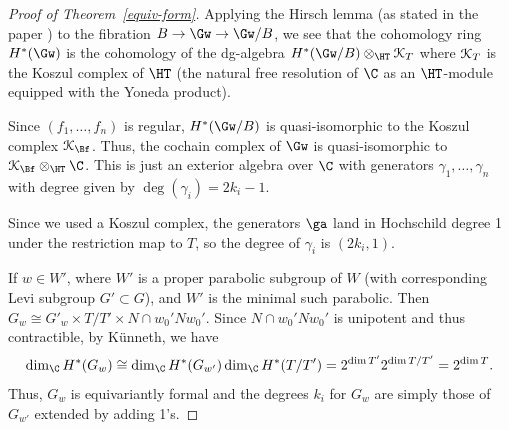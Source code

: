 \documentclass[12pt]{wart}
\theoremstyle{remark}
\begin{document}
\begin{proof}[Proof of Theorem~\ref{equiv-form}]
  Applying the Hirsch lemma (as stated in the paper \cite{DGMS}) to the
  fibration $B\to \Gw\to \Gw/B$, we see that the cohomology ring
  $H^*(\Gw)$ is the cohomology of the dg-algebra
  $H^*(\Gw/B)\otimes_\HT\EuScript{K}_T$ where $\EuScript{K}_T$ is the
  Koszul complex of $\HT$ (the natural free resolution of $\C$ as an
  $\HT$-module equipped with the Yoneda product).

  Since $(f_1,\ldots, f_{n})$ is regular, $H^*(\Gw/B)$ is
  quasi-isomorphic to the Koszul complex $\EuScript{K}_{\Bf}$.  Thus,
  the cochain complex of $\Gw$ is quasi-isomorphic to
  $\EuScript{K}_{\Bf}\otimes_\HT\C$.  This is just an exterior algebra
  over $\C$ with generators $\gamma_1,\ldots, \gamma_{n}$ with
  degree given by $\deg(\gamma_i)=2k_i-1$.

  Since we used a Koszul complex, the generators $\ga$ land in
  Hochschild degree 1 under the restriction map to $T$, so the degree
  of $\gamma_i$ is $(2k_i,1)$.

  If $w\in W'$, where $W'$ is a proper parabolic subgroup of $W$ (with
  corresponding Levi subgroup $G'\subset G$), and $W'$ is the minimal
  such parabolic.  Then $G_w\cong G'_w\times T/T'\times N\cap
  w_0'Nw_0'$.  Since $N\cap w_0'Nw_0'$ is unipotent and thus
  contractible, by K\"unneth, we have
  \begin{equation*}
\dim_\C H^*(G_w)\cong \dim_\C H^*(G_{w'})\dim_\C H^*(T/T')=2^{\dim T'}2^{\dim T/T'}=2^{\dim T}. \qedhere
\end{equation*}
Thus, $G_w$ is equivariantly formal and the degrees $k_i$ for $G_w$
are simply those of $G_{w'}$ extended by adding 1's.
\end{proof}

% 
% 
\end{document}

